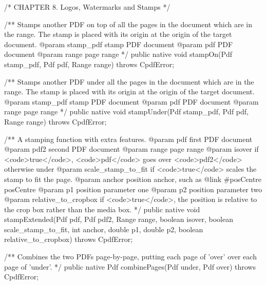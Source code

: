 /* CHAPTER 8. Logos, Watermarks and Stamps */

/** Stamps another PDF on top of all the pages in the document which are in
the range. The stamp is placed with its origin at the origin of the target
document.
@param stamp_pdf stamp PDF document
@param pdf PDF document
@param range page range */
public native void stampOn(Pdf stamp_pdf, Pdf pdf, Range range)
    throws CpdfError;

/** Stamps another PDF under all the pages in the document which are in the
range. The stamp is placed with its origin at the origin of the target
document.
@param stamp_pdf stamp PDF document
@param pdf PDF document
@param range page range */
public native void stampUnder(Pdf stamp_pdf, Pdf pdf, Range range)
    throws CpdfError;

/** A stamping function with extra features.
@param pdf first PDF document
@param pdf2 second PDF document
@param range page range
@param isover if <code>true</code>, <code>pdf</code> goes over
<code>pdf2</code> otherwise under
@param scale_stamp_to_fit if <code>true</code> scales the stamp to fit
the page.
@param anchor position anchor, such as {@link #posCentre posCentre}
@param p1 position parameter one
@param p2 position parameter two
@param relative_to_cropbox if <code>true</code>, the position is relative
to the crop box rather than the media box. */
public native void stampExtended(Pdf pdf, Pdf pdf2, Range range,
                                 boolean isover,
                                 boolean scale_stamp_to_fit, int anchor,
                                 double p1, double p2,
                                 boolean relative_to_cropbox)
    throws CpdfError;

/** Combines the two PDFs page-by-page, putting each page of 'over' over
each page of 'under'. */
public native Pdf combinePages(Pdf under, Pdf over) throws CpdfError;

